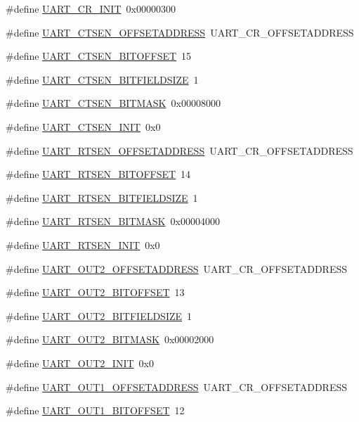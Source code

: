 \begin{DoxyCompactItemize}
\#define \hyperlink{a00575_ab0f4b31beb10fa434452e71cc798ee5c}{UART\_\-CR\_\-INIT}~0x00000300
\item 
\#define \hyperlink{a00575_a44f8e4dcc23f238b9323ddf7aae549e9}{UART\_\-CTSEN\_\-OFFSETADDRESS}~UART\_\-CR\_\-OFFSETADDRESS
\item 
\#define \hyperlink{a00575_ae1dd175958a218bc7de5d9ca9a9c442d}{UART\_\-CTSEN\_\-BITOFFSET}~15
\item 
\#define \hyperlink{a00575_afea3d11b5805bbc57521b70205ffb6a3}{UART\_\-CTSEN\_\-BITFIELDSIZE}~1
\item 
\#define \hyperlink{a00575_ac4f1d4cf659e4cbbbca323a3029efae7}{UART\_\-CTSEN\_\-BITMASK}~0x00008000
\item 
\#define \hyperlink{a00575_aab6477e289a2642880ba87faed6e8cb5}{UART\_\-CTSEN\_\-INIT}~0x0
\item 
\#define \hyperlink{a00575_ac96404e6223fe6c092a8d7adfd8ab3f0}{UART\_\-RTSEN\_\-OFFSETADDRESS}~UART\_\-CR\_\-OFFSETADDRESS
\item 
\#define \hyperlink{a00575_ae4a317d264aae9737dcf7c55d8830489}{UART\_\-RTSEN\_\-BITOFFSET}~14
\item 
\#define \hyperlink{a00575_aa49a75bb62cd602501745674998578cc}{UART\_\-RTSEN\_\-BITFIELDSIZE}~1
\item 
\#define \hyperlink{a00575_a7b53f7e3e6414fa325ad827a78b679c2}{UART\_\-RTSEN\_\-BITMASK}~0x00004000
\item 
\#define \hyperlink{a00575_a26124bab5188dec95bad1ac5ba690c8a}{UART\_\-RTSEN\_\-INIT}~0x0
\item 
\#define \hyperlink{a00575_af1683b0cbeb78fa61f1e4617ee5b9cd6}{UART\_\-OUT2\_\-OFFSETADDRESS}~UART\_\-CR\_\-OFFSETADDRESS
\item 
\#define \hyperlink{a00575_ae9b5d4c96a5b9bf72f65e51a60636d51}{UART\_\-OUT2\_\-BITOFFSET}~13
\item 
\#define \hyperlink{a00575_a40a7cd7b95212a83a818dd8597952e58}{UART\_\-OUT2\_\-BITFIELDSIZE}~1
\item 
\#define \hyperlink{a00575_a878e0c3a789400f57a13aff39e430e98}{UART\_\-OUT2\_\-BITMASK}~0x00002000
\item 
\#define \hyperlink{a00575_ac262e169f3d6fd6b6fba031cebcefa07}{UART\_\-OUT2\_\-INIT}~0x0
\item 
\#define \hyperlink{a00575_ab19dd309470c66272aa64fd1b0da19af}{UART\_\-OUT1\_\-OFFSETADDRESS}~UART\_\-CR\_\-OFFSETADDRESS
\item 
\#define \hyperlink{a00575_a6a173b4c1214a9c48cfc4fec04f3494c}{UART\_\-OUT1\_\-BITOFFSET}~12
\item 

\end{DoxyCompactItemize}
